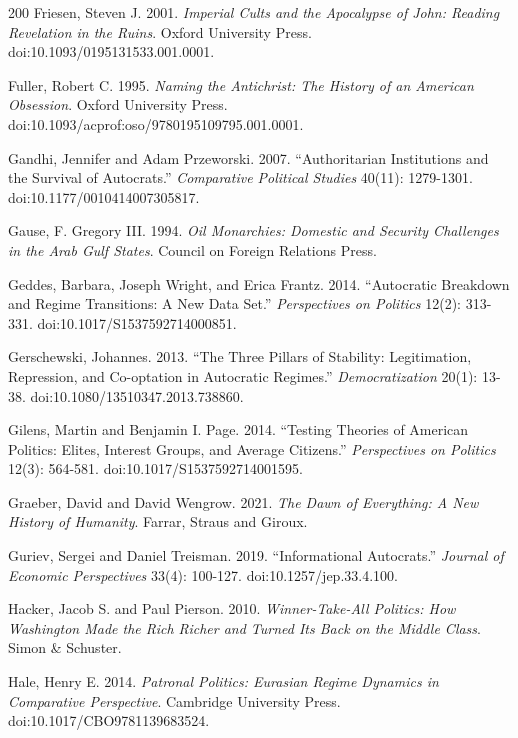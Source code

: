 \documentclass[11pt,letterpaper]{article}
\theoremstyle{definition}
\theoremstyle{remark}
\begin{document}
\begin{thebibliography}{200}
Friesen, Steven J. 2001. \emph{Imperial Cults and the Apocalypse of John: Reading Revelation in the Ruins}. Oxford University Press. doi:10.1093/0195131533.001.0001.

Fuller, Robert C. 1995. \emph{Naming the Antichrist: The History of an American Obsession}. Oxford University Press. doi:10.1093/acprof:oso/9780195109795.001.0001.

Gandhi, Jennifer and Adam Przeworski. 2007. ``Authoritarian Institutions and the Survival of Autocrats.'' \emph{Comparative Political Studies} 40(11): 1279-1301. doi:10.1177/0010414007305817.

Gause, F. Gregory III. 1994. \emph{Oil Monarchies: Domestic and Security Challenges in the Arab Gulf States}. Council on Foreign Relations Press.

Geddes, Barbara, Joseph Wright, and Erica Frantz. 2014. ``Autocratic Breakdown and Regime Transitions: A New Data Set.'' \emph{Perspectives on Politics} 12(2): 313-331. doi:10.1017/S1537592714000851.

Gerschewski, Johannes. 2013. ``The Three Pillars of Stability: Legitimation, Repression, and Co-optation in Autocratic Regimes.'' \emph{Democratization} 20(1): 13-38. doi:10.1080/13510347.2013.738860.

Gilens, Martin and Benjamin I. Page. 2014. ``Testing Theories of American Politics: Elites, Interest Groups, and Average Citizens.'' \emph{Perspectives on Politics} 12(3): 564-581. doi:10.1017/S1537592714001595.

Graeber, David and David Wengrow. 2021. \emph{The Dawn of Everything: A New History of Humanity}. Farrar, Straus and Giroux.

Guriev, Sergei and Daniel Treisman. 2019. ``Informational Autocrats.'' \emph{Journal of Economic Perspectives} 33(4): 100-127. doi:10.1257/jep.33.4.100.

Hacker, Jacob S. and Paul Pierson. 2010. \emph{Winner-Take-All Politics: How Washington Made the Rich Richer and Turned Its Back on the Middle Class}. Simon \& Schuster.

Hale, Henry E. 2014. \emph{Patronal Politics: Eurasian Regime Dynamics in Comparative Perspective}. Cambridge University Press. doi:10.1017/CBO9781139683524.


\end{thebibliography}
\end{document}
